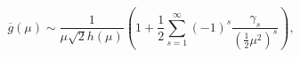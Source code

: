 \[\overline{g}(\mu)\sim\frac{1}{\mu\sqrt{2}h(\mu)}\left(1+\frac{1}{2}\sum_{s=1}^%
{\infty}(-1)^{s}\frac{\gamma_{s}}{(\frac{1}{2}\mu^{2})^{s}}\right),\]